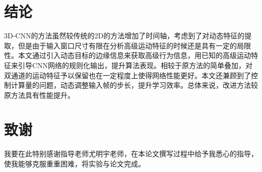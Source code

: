 \documentclass[a4paper, 12pt]{article}
\begin{document}
\section{结论}
3D-CNN的方法虽然较传统的2D的方法增加了时间轴，考虑到了对动态特征的提取，但是由于输入窗口尺寸有限在分析高级运动特征的时候还是具有一定的局限性。本文通过引入动态目标的边缘信息来获取高级行为信息，用已知的高级运动特征来引导CNN网络的规则化输出，提升算法表现。相较于原方法的简单叠加，对双通道的运动特征予以保留也在一定程度上使得网络性能更好。本文还兼顾到了控制计算量的问题，动态调整输入帧的步长，提升学习效率。总体来说，改进方法较原方法具有性能提升。

\section*{致谢}
我要在此特别感谢指导老师尤明宇老师，在本论文撰写过程中给予我悉心的指导，使我能够克服重重困难，将实验与论文完成。



\end{document}

